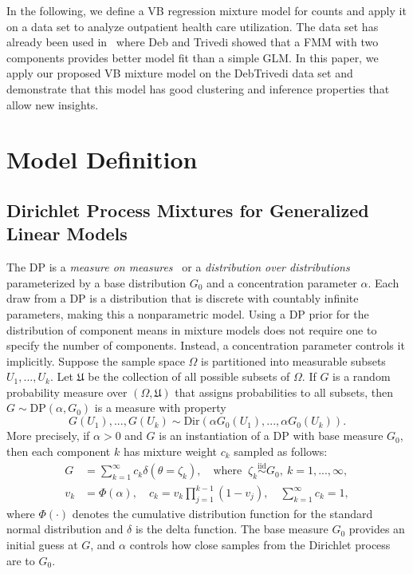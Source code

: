 \documentclass[a4paper,UKenglish]{oasics}
\begin{document}
In the following, we define a VB regression mixture model for counts and apply it on a data set to analyze outpatient health care utilization. The data set has already been used in~\cite{DebTrivedi} where Deb and Trivedi showed that a FMM with two components provides better model fit than a simple GLM. In this paper, we apply our proposed VB mixture model on the DebTrivedi data set and demonstrate that this model has good clustering and inference properties that allow new insights.

\section{Model Definition}
\subsection{Dirichlet Process Mixtures for Generalized Linear Models\label{s:dpp_models}}
The DP is a \emph{measure on measures}~\cite{blei2006} or a \emph{distribution over distributions}~\cite{sammut} parameterized by a base distribution $G_0$ and a concentration parameter $\alpha$. Each draw from a DP is a distribution that is discrete with countably infinite parameters, making this a nonparametric model.
Using a DP prior for the distribution of component means in mixture models does not require one to specify the number of components. Instead, a concentration parameter controls it implicitly.
Suppose the sample space $\Omega$ is partitioned into measurable subsets $U_1,...,U_k$. Let $\mathfrak{U}$ be the collection of all possible subsets of $\Omega$. If $G$ is a random probability measure over $(\Omega,\mathfrak{U})$ that assigns probabilities to all subsets, then $G\sim\text{DP}(\alpha, G_0)$ is a measure with property
$$
G(U_1),...,G(U_k) \sim \text{Dir}(\alpha G_0(U_1),..., \alpha G_0(U_k)).
$$
More precisely, if $\alpha>0$ and $G$ is an instantiation of a DP with base measure $G_0$, then each component $k$ has mixture weight $c_k$ sampled as follows:
\begin{align}
G&=\sum_{k=1}^{\infty}c_k \delta(\theta=\zeta_k),\quad \text{where    }\ \zeta_k \overset{\text{iid}}{\sim} G_0,\ k=1,...,\infty,\nonumber \\
v_k &= \Phi(\alpha), %
\quad c_k = v_k \prod_{j=1}^{k-1}(1-v_j),\quad \sum_{k=1}^{\infty}c_k=1,
\end{align}\label{eq:dp}
where $\Phi(\cdot)$ denotes the cumulative distribution function for the standard normal distribution and $\delta$ is the delta function. The base measure $G_0$ provides an initial guess at $G$, and $\alpha$ controls how close samples from the Dirichlet process are to $G_0$.
\end{document}
